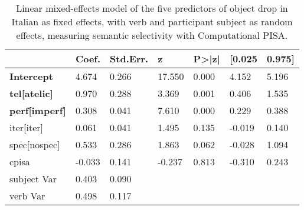 \begin{table}[htb] %
\caption{Linear mixed-effects model of the five predictors of object drop in Italian as fixed effects, with verb and participant subject as random effects, measuring semantic selectivity with Computational PISA.}
\begin{tabular}{l|llllll}
                         & Coef. & Std.Err. & z      & P\textgreater{}|z| & {[}0.025 & 0.975{]} \\
\hline                         
\textbf{Intercept}                & 4.674  & 0.266    & 17.550 & 0.000              & 4.152    & 5.196    \\
\textbf{tel{[}atelic{]}}     & 0.970  & 0.288    & 3.369  & 0.001              & 0.406    & 1.535    \\
\textbf{perf{[}imperf{]}} & 0.308  & 0.041    & 7.610  & 0.000              & 0.229    & 0.388    \\
iter{[}iter{]}    & 0.061  & 0.041    & 1.495  & 0.135              & -0.019   & 0.140    \\
spec{[}nospec{]}     & 0.533  & 0.286    & 1.863  & 0.062              & -0.028   & 1.094    \\
cpisa                    & -0.033 & 0.141    & -0.237 & 0.813              & -0.310   & 0.243    \\
subject Var              & 0.403  & 0.090     &        &                    &          &          \\
verb Var                 & 0.498  & 0.117    &        &                    &          &         
\end{tabular}  
\end{table}

